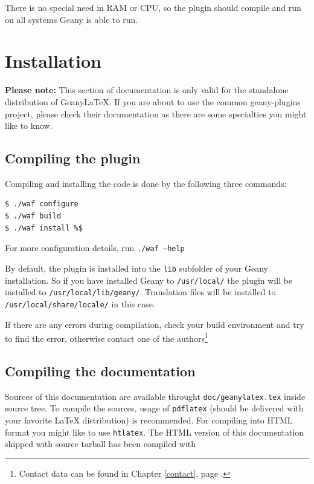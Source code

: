 \documentclass[%
paper=a4,%
fontsize=11pt,%
twoside=false,%
DIV18,%
headsepline,%
plainheadsepline,%
footsepline,%
plainfootsepline,%
bibliography=totoc,%
listof=totoc,%
BCOR10mm,%
parskip=half,%
openany,%
]{scrartcl}
\begin{document}
There is no special need in RAM or CPU, so the plugin should compile and
run on all systems Geany is able to run.

\section{Installation}

\small{\textbf{Please note:} This section of documentation is only
valid for the standalone distribution of Geany\LaTeX{}. If you are
about to use the common geany-plugins project, please check their
documentation as there are some specialties you might like to know.}

\subsection{Compiling the plugin}
Compiling and installing the code is done by the following three
commands:

\begin{lstlisting}[caption={Compiling with waf}]
$ ./waf configure
$ ./waf build
$ ./waf install %$
\end{lstlisting}

For more configuration details, run \texttt{./waf --help}

By default, the plugin is installed into the \texttt{lib} subfolder of
your Geany installation. So if you have installed Geany to
\texttt{/usr/local/} the plugin will be installed to
\texttt{/usr/local/lib/geany/}. Translation files will be installed to
\texttt{/usr/local/share/locale/} in this case.

If there are any errors during compilation, check your build environment
and try to find the error, otherwise contact one of the
authors\footnote{Contact data can be found in Chapter \ref{contact},
page \pageref{contact}.}

\subsection{Compiling the documentation}
\label{sec:compiling_of_documentation}
Sources of this documentation are available throught
\texttt{doc/geanylatex.tex} inside source tree. To compile the sources,
usage of \texttt{pdflatex} (should be delivered with your favorite
\LaTeX{} distribution) is recommended. For compiling into HTML format you
might like to use \texttt{htlatex}. The HTML version of this documentation
shipped with source tarball has been compiled with
\end{document}
